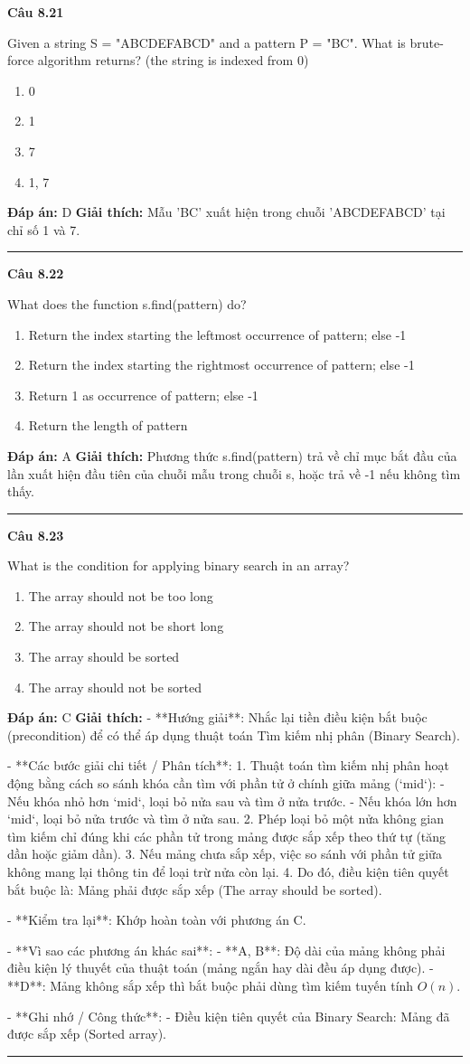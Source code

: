 \documentclass[11pt,a4paper]{article}
\newenvironment{question}[1]{%
  \par\vspace{1em}\noindent\textbf{\large Câu #1}\par\vspace{0.4em}
}{%
  \par\vspace{1em}\hrule\vspace{0.6em}
}
\newenvironment{choices}{%
  \begin{enumerate}[label=\textbf{\Alph*.},leftmargin=2.2em,itemsep=2pt,topsep=3pt]
}{%
  \end{enumerate}
}
\newcommand{\choice}{\item}
\begin{document}
\begin{question}{8.21}
Given a string S = "ABCDEFABCD" and a pattern P = "BC". What is brute-force algorithm returns? (the string is indexed from 0)
\begin{choices}
\choice 0
\choice 1
\choice 7
\choice 1, 7
\end{choices}
\textbf{Đáp án:} D
\textbf{Giải thích:} Mẫu 'BC' xuất hiện trong chuỗi 'ABCDEFABCD' tại chỉ số 1 và 7.
\end{question}

\begin{question}{8.22}
What does the function s.find(pattern) do?
\begin{choices}
\choice Return the index starting the leftmost occurrence of pattern; else -1
\choice Return the index starting the rightmost occurrence of pattern; else -1
\choice Return 1 as occurrence of pattern; else -1
\choice Return the length of pattern
\end{choices}
\textbf{Đáp án:} A
\textbf{Giải thích:} Phương thức s.find(pattern) trả về chỉ mục bắt đầu của lần xuất hiện đầu tiên của chuỗi mẫu trong chuỗi s, hoặc trả về -1 nếu không tìm thấy.
\end{question}

\begin{question}{8.23}
What is the condition for applying binary search in an array?
\begin{choices}
\choice The array should not be too long
\choice The array should not be short long
\choice The array should be sorted
\choice The array should not be sorted
\end{choices}
\textbf{Đáp án:} C
\textbf{Giải thích:} - **Hướng giải**:
  Nhắc lại tiền điều kiện bắt buộc (precondition) để có thể áp dụng thuật toán Tìm kiếm nhị phân (Binary Search).

- **Các bước giải chi tiết / Phân tích**:
  1. Thuật toán tìm kiếm nhị phân hoạt động bằng cách so sánh khóa cần tìm với phần tử ở chính giữa mảng (`mid`):
     - Nếu khóa nhỏ hơn `mid`, loại bỏ nửa sau và tìm ở nửa trước.
     - Nếu khóa lớn hơn `mid`, loại bỏ nửa trước và tìm ở nửa sau.
  2. Phép loại bỏ một nửa không gian tìm kiếm chỉ đúng khi các phần tử trong mảng được sắp xếp theo thứ tự (tăng dần hoặc giảm dần).
  3. Nếu mảng chưa sắp xếp, việc so sánh với phần tử giữa không mang lại thông tin để loại trừ nửa còn lại.
  4. Do đó, điều kiện tiên quyết bắt buộc là: Mảng phải được sắp xếp (The array should be sorted).

- **Kiểm tra lại**:
  Khớp hoàn toàn với phương án C.

- **Vì sao các phương án khác sai**:
  - **A, B**: Độ dài của mảng không phải điều kiện lý thuyết của thuật toán (mảng ngắn hay dài đều áp dụng được).
  - **D**: Mảng không sắp xếp thì bắt buộc phải dùng tìm kiếm tuyến tính \(O(n)\).

- **Ghi nhớ / Công thức**:
  - Điều kiện tiên quyết của Binary Search: Mảng đã được sắp xếp (Sorted array).
\end{question}
\end{document}

